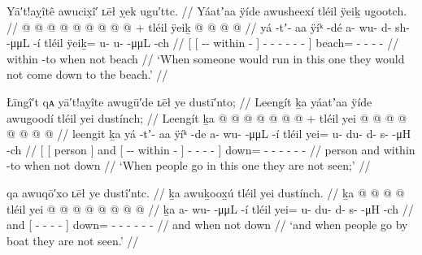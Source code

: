 \ex\label{ex:91-123-this-one-run-not-back-beach}%
%
\begingl
	\glpreamble	Yā′t!aỵîtê awucix̣î′ ʟēł ỵek ugu′ttc. //
	\glpreamble	Yáatʼaa ÿíde awusheexí tléil ÿeiḵ ugootch. //
	\gla	{} {}  @ {} @ {}  @ {} {}
			 @ {} @ {} @ {} @ {} @ {} @ {} {} +
		tléil ÿeiḵ  @ {} @ {} @ {} @ {} //
	\glb	{} {} yá -tʼ- aa ÿíᵏ -dé {} a- wu- d- sh-  -μμL -í {}
		tléil ÿeiḵ= u- u-  -μμL -ch //
	\glc	{}[ {}[  --  within - {}]
			- - - -
				 - - {}]
		 beach= - -  - - //
	\gld	{} {}  {} {} within -to {}
			 {} {} {} {} {} \·when {}
		not beach  {} {} {} {} //
	\glft	‘When someone would run in this one they would not come down to the beach.’
		//
\endgl
\xe

\ex\label{ex:91-124-ppl-go-not-seen}%
%
\begingl
	\glpreamble	Łīngî′t qᴀ yā′t!aỵîte awugū′de ʟēł ye dustī′nto; //
	\glpreamble	Leengít ḵa yáatʼaa ÿíde awugoodí tléil yei dustínch; //
	\gla	{} {} Leengít {} ḵa {}  @ {} @ {}  @ {} {}
			 @ {} @ {} @ {} @ {} {} +
		tléil yei @  @ {} @ {} @ {} @ {} @ {} @ {} @ {} //
	\glb	{} {} leengit {} ḵa {} yá -tʼ- aa ÿíᵏ -de {}
			a- wu-  -μμL -í {}
		tléil yei= u- du- d- s-  -μH -ch //
	\glc	{}[ {}[ person {}] and
			{}[  --  within - {}]
			- -  - - {}]
		 down= - - - -
			 - - //
	\gld	{} {} person {} and {}  {} {} within -to {}
			 {} {} {} \·when {}
		not down  {} {} {} {} {} {} {} //
	\glft	‘When people go in this one they are not seen;’
		//
\endgl
\xe



\ex\label{ex:91-125-ppl-boat-not-seen}%
%
\begingl
	\glpreamble	qa awuqō′xo ʟēł ye dustî′ntc. //
	\glpreamble	ḵa awuḵoox̱ú tléil yei dustínch. //
	\gla	ḵa {}  @ {} @ {} @ {} @ {} {}
		tléil yei @  @ {} @ {} @ {} @ {} @ {} @ {} @ {} //
	\glb	ḵa {} a- wu-  -μμL -í {}
		tléil yei= u- du- d- s-  -μH -ch //
	\glc	and {}[ - -  - - {}]
		 down= - - - -
			 - - //
	\gld	and {}  {} {} {} \·when {}
		not down  {} {} {} {} {} {} {} //
	\glft	‘and when people go by boat they are not seen.’
		//
\endgl
\xe


